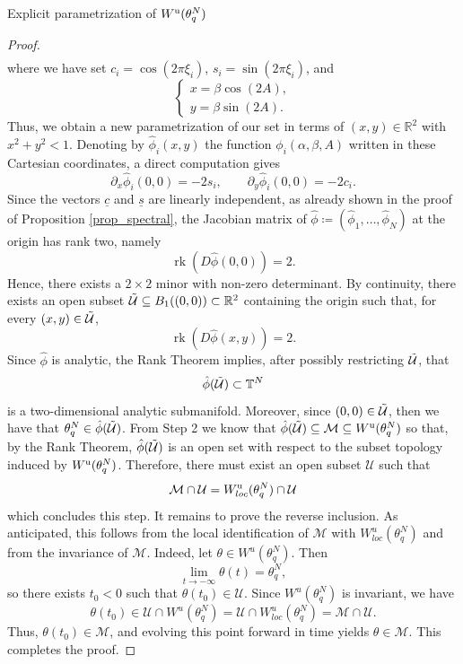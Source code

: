 \documentclass{article}
\theoremstyle{definition}
\newcommand{\jump}{\hfill\break}
\newcommand{\R}{\mathbb{R}}
\newcommand{\T}{\mathbb{T}}
\renewcommand{\u}{\textnormal{u}}
\begin{document}
\begin{section}{Explicit parametrization of $W^\u(\theta^N_q)$}
\begin{proof}
\begin{align*}
    \end{align*}
where we have set $c_i=\cos(2\pi\xi_i)$, $s_i=\sin(2\pi\xi_i)$, and
    $$\begin{cases}
        x=\beta\cos(2A),\\
        y=\beta\sin(2A).
    \end{cases}$$
Thus, we obtain a new parametrization of our set in terms of $(x,y)\in\R^2$ with $x^2+y^2<1$. Denoting by $\hat{\phi}_i(x,y)$ the function $\phi_i(\alpha,\beta,A)$ written in these Cartesian coordinates, a direct computation gives
    \begin{equation}\label{tangency_comp}
        \partial_x\hat{\phi}_i(0,0)=-2s_i,\qquad\partial_y\hat{\phi}_i(0,0)=-2c_i.
    \end{equation}
    Since the vectors $\underline{c}$ and $\underline{s}$ are linearly independent, as already shown in the proof of Proposition \ref{prop_spectral}, the Jacobian matrix of $\hat{\phi}\coloneqq(\hat{\phi}_1,\ldots,\hat{\phi}_N)$ at the origin has rank two, namely
    $$\operatorname{rk}\left(D\hat{\phi}(0,0)\right)=2.$$
    Hence, there exists a $2\times2$ minor with non-zero determinant. By continuity, there exists an open subset $\Tilde{\mathcal{U}}\subseteq B_1((0,0))\subset\R^2$ containing the origin such that, for every $(x,y)\in\Tilde{\mathcal{U}}$,
    $$\operatorname{rk}\left(D\hat{\phi}(x,y)\right)=2.$$
    Since $\hat{\phi}$ is analytic, the Rank Theorem \cite{narasimhan1965lectures} implies, after possibly restricting $\Tilde{\mathcal{U}}$, that
    $$\hat{\phi}(\Tilde{\mathcal{U}})\subset\T^N$$
    is a two-dimensional analytic submanifold. Moreover, since $(0,0)\in\Tilde{\mathcal{U}}$, then we have that $\theta^N_q\in\hat\phi(\Tilde{\mathcal{U}})$. From Step 2 we know that $\hat\phi(\Tilde{\mathcal{U}})\subseteq\mathcal{M}\subseteq W^\u(\theta^N_q)$ so that, by the Rank Theorem, $\hat\phi(\Tilde{\mathcal{U}})$ is an open set with respect to the subset topology induced by $W^\u(\theta^N_q)$. Therefore, there must exist an open subset $\mathcal{U}$ such that
    $$\mathcal{M}\cap\mathcal{U}=W^\u_{loc}(\theta^N_q)\cap\mathcal{U}$$
    which concludes this step.\jump\jump\noindent
\fbox{\textbf{Step 4:} $W^\u(\theta^N_q)\subseteq\mathcal{M}$} It remains to prove the reverse inclusion. As anticipated, this follows from the local identification of $\mathcal{M}$ with $W^u_{loc}(\theta^N_q)$ and from the invariance of $\mathcal{M}$. Indeed, let $\theta\in W^u(\theta^N_q)$. Then
    $$\underset{t\rightarrow-\infty}{\lim}\theta(t)=\theta^N_q,$$
so there exists $t_0<0$ such that $\theta(t_0)\in\mathcal{U}$. Since $W^u(\theta^N_q)$ is invariant, we have
    $$\theta(t_0)\in\mathcal{U}\cap W^u(\theta^N_q)=\mathcal{U}\cap W^u_{loc}(\theta^N_q)=\mathcal{M}\cap\mathcal{U}.$$
Thus, $\theta(t_0)\in\mathcal{M}$, and evolving this point forward in time yields $\theta\in\mathcal{M}$. This completes the proof.
\end{proof}


\end{section}
\end{document}
